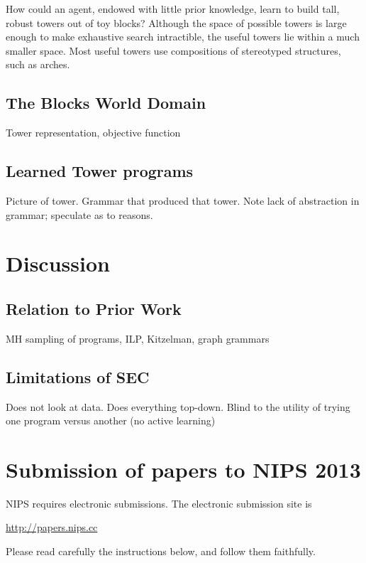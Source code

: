 \documentclass{article} %
\begin{document}
How could an agent, endowed with little prior knowledge, learn to build tall, robust towers out of toy blocks?
Although the space of possible towers is large enough to make exhaustive search intractible, the useful towers lie within a much smaller space.
Most useful towers use compositions of stereotyped structures, such as arches.

\subsection{The Blocks World Domain}

Tower representation, objective function

\subsection{Learned Tower programs}

Picture of tower. Grammar that produced that tower. Note lack of abstraction in grammar; speculate as to reasons.

\section{Discussion}

\subsection{Relation to Prior Work}

MH sampling of programs, ILP, Kitzelman, graph grammars

\subsection{Limitations of SEC}

Does not look at data. Does everything top-down. Blind to the utility of trying one program versus another (no active learning)

\section{Submission of papers to NIPS 2013}

NIPS requires electronic submissions.  The electronic submission site is  
\begin{center}
   \url{http://papers.nips.cc}
\end{center}

Please read carefully the
instructions below, and follow them faithfully.
\end{document}
